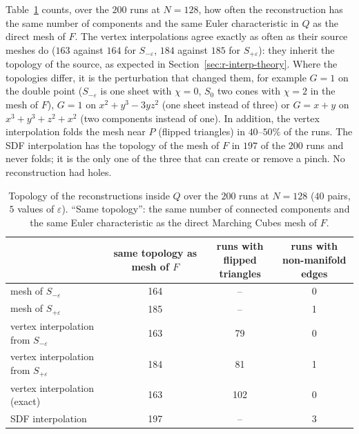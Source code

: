 \documentclass[12pt, a4paper, oneside]{book}
\theoremstyle{plain}
\theoremstyle{definition}
\theoremstyle{remark}
\theoremstyle{definition}
\begin{document}
Table~\ref{tab:interp-topology} counts, over the $200$ runs at $N=128$, how often the reconstruction has the same number of components and the same Euler characteristic in $Q$ as the direct mesh of $F$. The vertex interpolations agree exactly as often as their source meshes do ($163$ against $164$ for $S_{-\varepsilon}$, $184$ against $185$ for $S_{+\varepsilon}$): they inherit the topology of the source, as expected in Section~\ref{sec:r-interp-theory}. Where the topologies differ, it is the perturbation that changed them, for example $G=1$ on the double point ($S_{-\varepsilon}$ is one sheet with $\chi=0$, $S_0$ two cones with $\chi=2$ in the mesh of $F$), $G=1$ on $x^2+y^3-3yz^2$ (one sheet instead of three) or $G=x+y$ on $x^3+y^3+z^2+x^2$ (two components instead of one). In addition, the vertex interpolation folds the mesh near $P$ (flipped triangles) in $40$--$50\%$ of the runs. The SDF interpolation has the topology of the mesh of $F$ in $197$ of the $200$ runs and never folds; it is the only one of the three that can create or remove a pinch. No reconstruction had holes.

\begin{table}[!ht]
\centering
\small
\begin{tabular}{l c c c}
\toprule
& \makecell{same topology\\as mesh of $F$}
& \makecell{runs with\\flipped triangles}
& \makecell{runs with\\non-manifold edges} \\
\midrule
mesh of $S_{-\varepsilon}$ & 164 & -- & 0 \\
mesh of $S_{+\varepsilon}$ & 185 & -- & 1 \\
vertex interpolation from $S_{-\varepsilon}$ & 163 & 79 & 0 \\
vertex interpolation from $S_{+\varepsilon}$ & 184 & 81 & 1 \\
vertex interpolation (exact) & 163 & 102 & 0 \\
SDF interpolation & 197 & -- & 3 \\
\bottomrule
\end{tabular}
\caption[Interpolation: topology]{Topology of the reconstructions inside $Q$ over the $200$ runs at $N=128$ ($40$ pairs, $5$ values of $\varepsilon$). ``Same topology'': the same number of connected components and the same Euler characteristic as the direct Marching Cubes mesh of $F$.}
\label{tab:interp-topology}
\end{table}
\end{document}
